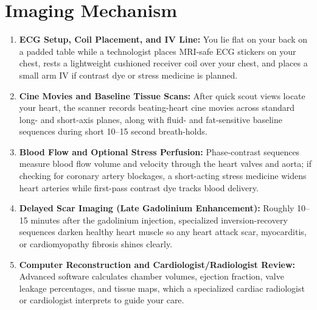 \section{Imaging Mechanism}
\begin{enumerate}
\item \textbf{ECG Setup, Coil Placement, and IV Line:} You lie flat on your back on a padded table while a technologist places MRI-safe ECG stickers on your chest, rests a lightweight cushioned receiver coil over your chest, and places a small arm IV if contrast dye or stress medicine is planned.
\item \textbf{Cine Movies and Baseline Tissue Scans:} After quick scout views locate your heart, the scanner records beating-heart cine movies across standard long- and short-axis planes, along with fluid- and fat-sensitive baseline sequences during short 10--15 second breath-holds.
\item \textbf{Blood Flow and Optional Stress Perfusion:} Phase-contrast sequences measure blood flow volume and velocity through the heart valves and aorta; if checking for coronary artery blockages, a short-acting stress medicine widens heart arteries while first-pass contrast dye tracks blood delivery.
\item \textbf{Delayed Scar Imaging (Late Gadolinium Enhancement):} Roughly 10--15 minutes after the gadolinium injection, specialized inversion-recovery sequences darken healthy heart muscle so any heart attack scar, myocarditis, or cardiomyopathy fibrosis shines clearly.
\item \textbf{Computer Reconstruction and Cardiologist/Radiologist Review:} Advanced software calculates chamber volumes, ejection fraction, valve leakage percentages, and tissue maps, which a specialized cardiac radiologist or cardiologist interprets to guide your care.
\end{enumerate}

